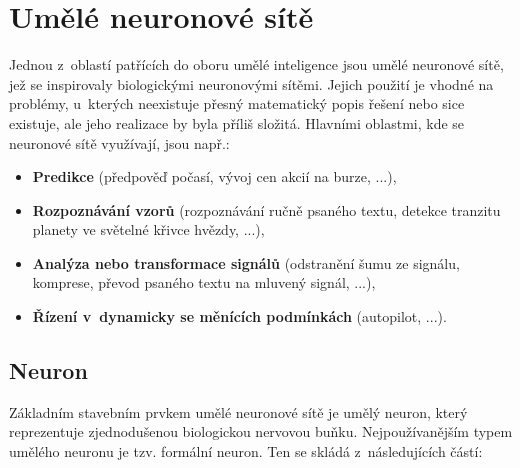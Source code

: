\documentclass[a4paper,12pt]{article}
\begin{document}
{{{
\drawgimp

\section{Umělé neuronové sítě}

Jednou z~oblastí patřících do oboru umělé inteligence jsou umělé neuronové sítě, jež se inspirovaly biologickými neuronovými sítěmi. Jejich použití je vhodné na problémy, u~kterých neexistuje přesný matematický popis řešení nebo sice existuje, ale jeho realizace by byla příliš složitá. Hlavními oblastmi, kde se neuronové sítě využívají, jsou např.:

\begin{itemize}
\item \textbf{Predikce} (předpověď počasí,  vývoj cen akcií na burze, ...),

\item \textbf{Rozpoznávání vzorů} (rozpoznávání ručně psaného textu, detekce tranzitu planety ve světelné křivce hvězdy, ...),

\item \textbf{Analýza nebo transformace signálů} (odstranění šumu ze signálu, komprese, převod psaného textu na mluvený signál, ...),

\item \textbf{Řízení v~dynamicky se měnících podmínkách} (autopilot, ...).~\cite{nn}

\end{itemize}

\subsection{Neuron}

Základním stavebním prvkem umělé neuronové sítě je umělý neuron, který reprezentuje zjednodušenou biologickou nervovou buňku. Nejpoužívanějším typem umělého neuronu je tzv. formální neuron. Ten se skládá z~následujících částí:

{

}}}}
\end{document}
